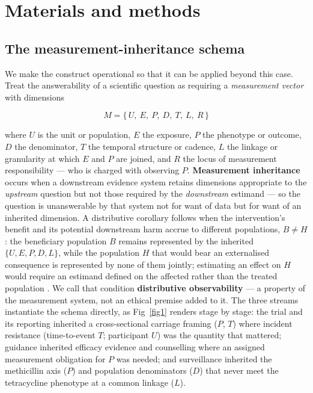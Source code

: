 \documentclass[10pt,letterpaper]{article}
\begin{document}
\section*{Materials and methods}

\subsection*{The measurement-inheritance schema}

We make the construct operational so that it can be applied beyond this
case. Treat the answerability of a scientific question as requiring a
\emph{measurement vector} with dimensions

\[M = \{\,U,\ E,\ P,\ D,\ T,\ L,\ R\,\}\]

where \(U\) is the unit or population, \(E\) the exposure, \(P\) the
phenotype or outcome, \(D\) the denominator, \(T\) the temporal
structure or cadence, \(L\) the linkage or granularity at which \(E\)
and \(P\) are joined, and \(R\) the locus of measurement responsibility
--- who is charged with observing \(P\). \textbf{Measurement
inheritance} occurs when a downstream evidence system retains dimensions
appropriate to the \emph{upstream} question but not those required by
the \emph{downstream} estimand --- so the question is unanswerable by
that system not for want of data but for want of an inherited dimension.
A distributive corollary follows when the intervention's benefit and its
potential downstream harm accrue to different populations, \(B \neq H\):
the beneficiary population \(B\) remains represented by the inherited
\(\{U,E,P,D,L\}\), while the population \(H\) that would bear an
externalised consequence is represented by none of them jointly; estimating an effect on $H$ would require an estimand defined on the affected rather than the treated population \cite{montoya2025affected}. We call that condition \textbf{distributive observability} --- a property of the
measurement system, not an ethical premise added to it. The three streams instantiate the schema directly, as Fig~\ref{fig1} renders stage by stage: the trial and its reporting inherited a cross-sectional carriage framing ($P$, $T$) where incident resistance (time-to-event $T$; participant $U$) was the quantity that mattered; guidance inherited efficacy evidence and counselling where an assigned measurement obligation for $P$ was needed; and surveillance inherited the methicillin axis ($P$) and population denominators ($D$) that never meet the tetracycline phenotype at a common linkage ($L$).
\end{document}
